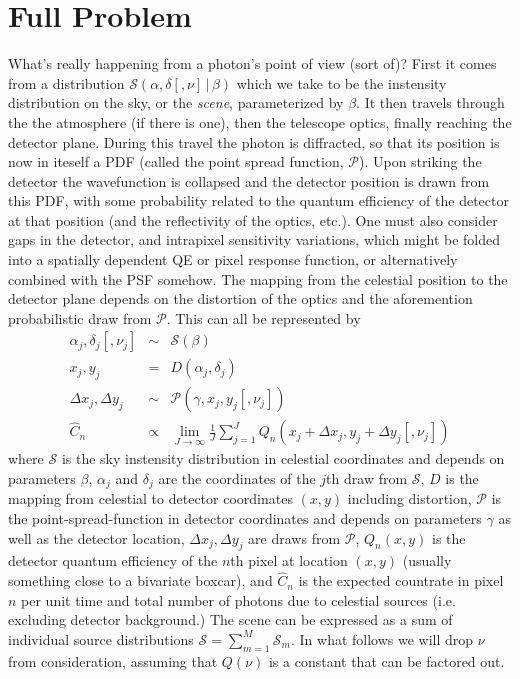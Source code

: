 \documentclass[modern]{aastex6}
\newcommand{\given}{\,|\,}
\newcommand{\countrate}{\hat{C}}
\newcommand{\psf}{\mathcal{P}}
\newcommand{\qe}{Q}
\newcommand{\scene}{\mathcal{S}}
\begin{document}
\section{Full Problem}
What's really happening from a photon's point of view (sort of)?
First it comes from a distribution $\scene(\alpha, \delta [, \nu] \given \beta)$ which we take to be the instensity distribution on the sky, or the \emph{scene},
parameterized by $\beta$.
It then travels through the the atmosphere (if there is one), then the telescope optics, finally reaching the detector plane.
During this travel the photon is diffracted, so that its position is now in iteself a PDF (called the point spread function, $\psf$).
Upon striking the detector the wavefunction is collapsed and the detector position is drawn from this PDF, 
with some probability related to the quantum efficiency of the detector at that position (and the reflectivity of the optics, etc.).
One must also consider gaps in the detector, and intrapixel sensitivity variations, which might be folded into a spatially dependent QE or pixel response function, 
or alternatively combined with the PSF somehow.
The mapping from the celestial position to the detector plane depends on the distortion of the optics and the aforemention probabilistic draw from $\psf$.
This can all be represented by 
\begin{eqnarray}
\label{eqn:photon}
\alpha_j, \delta_j [, \nu_j] & \sim & \scene(\beta)\\
x_j, y_j & = & D(\alpha_j, \delta_j)  \nonumber \\ 
\Delta x_j, \Delta y_j & \sim & \psf(\gamma, x_j, y_j [, \nu_j]) \nonumber \\
\countrate_n & \propto & \lim_{J\to\infty} \frac{1}{J} \sum^J_{j=1} \qe_n(x_j+ \Delta x_j, y_j + \Delta y_j [, \nu_j]) \nonumber
\end{eqnarray}
where $\scene$ is the sky instensity distribution in celestial coordinates 
and depends on parameters $\beta$,
$\alpha_j$ and $\delta_j$ are the coordinates of the $j$th draw from $\scene$,
$D$ is the mapping from celestial to detector coordinates $(x, y)$ including distortion,
$\psf$ is the point-spread-function in detector coordinates and depends on parameters $\gamma$ as well as the detector location,
$\Delta x_j, \Delta y_j$ are draws from $\psf$,
$\qe_n(x, y)$ is the detector quantum efficiency of the $n$th pixel at location $(x, y)$ (usually something close to a bivariate boxcar),
and $\countrate_n$ is the expected countrate in pixel $n$ per unit time and total number of photons due to celestial sources (i.e. excluding detector background.)
The scene can be expressed as a sum of individual source distributions $\scene = \sum_{m=1}^M \scene_m$.
In what follows we will drop $\nu$ from consideration, assuming that $\qe(\nu)$ is a constant that can be factored out.
\end{document}
